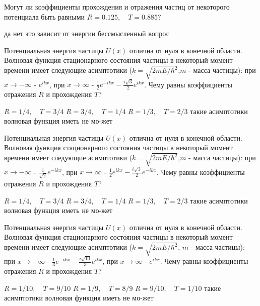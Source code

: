 \documentclass[11pt,a4paper]{exam}
\begin{document}
\begin{questions}
\question Могут ли коэффициенты прохождения и отражения частиц от некоторого потенциала быть равными $R = 0.125,\quad T = 0.885$?
\begin{choices}
\choice да             
\choice нет
\choice это зависит от энергии     
\choice бессмысленный вопрос
\end{choices}

\question Потенциальная энергия частицы $U(x)$ отлична от нуля в конечной области. Волновая функция стационарного состояния частицы в некоторый момент времени имеет следующие асимптотики ($k = \sqrt {2mE/{\hbar ^2}} $,$m$ - масса частицы): при $x \to  - \infty $ - ${e^{ikx}}$, при $x \to \infty $ - $\frac{1}{2}{e^{ - ikx}} - \frac{{i\sqrt 3 }}{2}{e^{ikx}}$. Чему равны коэффициенты отражения $R$ и прохождения $T$?
\begin{choices}
\choice $R = 1/4,\quad T = 3/4$       
\choice $R = 3/4,\quad T = 1/4$
\choice $R = 1/3,\quad T = 2/3$       
\choice такие асимптотики волновая функция иметь не мо-жет
\end{choices}

\question Потенциальная энергия частицы $U(x)$ отлична от нуля в конечной области. Волновая функция стационарного состояния частицы в некоторый момент времени имеет следующие асимптотики ($k = \sqrt {2mE/{\hbar ^2}} $,$m$ - масса частицы): при $x \to  - \infty $ - $\frac{1}{{\sqrt 2 }}{e^{ - ikx}}$, при $x \to \infty $ - $\frac{1}{2}{e^{ikx}} - \frac{{i\sqrt 3 }}{2}{e^{ - ikx}}$. Чему равны коэффициенты отражения $R$ и прохождения $T$?
\begin{choices}
\choice $R = 1/4,\quad T = 3/4$       
\choice $R = 3/4,\quad T = 1/4$
\choice $R = 1/3,\quad T = 2/3$       
\choice такие асимптотики волновая функция иметь не мо-жет
\end{choices}

\question Потенциальная энергия частицы $U(x)$ отлична от нуля в конечной области. Волновая функция стационарного состояния частицы в некоторый момент времени имеет следующие асимптотики ($k = \sqrt {2mE/{\hbar ^2}} $, $m$ - масса частицы): при $x \to  - \infty $ - $\frac{1}{3}{e^{ - ikx}} - \frac{{i\sqrt {10} }}{3}{e^{ikx}}$, при $x \to \infty $ - ${e^{ikx}}$. Чему равны коэффициенты отражения $R$ и прохождения $T$?
\begin{choices}
\choice $R = 1/10,\quad T = 9/10$     
\choice $R = 1/9,\quad T = 8/9$
\choice $R = 9/10,\quad T = 1/10$     
\choice такие асимптотики волновая функция иметь не мо-жет
\end{choices}


\end{questions}
\end{document}
